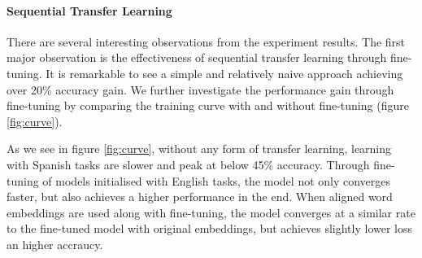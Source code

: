 \documentclass[]{article}
\begin{document}
\paragraph{Sequential Transfer Learning}
There are several interesting observations from the experiment results. The first major observation is the effectiveness of sequential transfer learning through fine-tuning. It is remarkable to see a simple and relatively naive approach achieving over 20\% accuracy gain. We further investigate the performance gain through fine-tuning by comparing the training curve with and without fine-tuning (figure \ref{fig:curve}).

As we see in figure \ref{fig:curve}, without any form of transfer learning, learning with Spanish tasks are slower and peak at below 45\% accuracy. Through fine-tuning of models initialised with English tasks, the model not only converges faster, but also achieves a higher performance in the end. When aligned word embeddings are used along with fine-tuning, the model converges at a similar rate to the fine-tuned model with original embeddings, but achieves slightly lower loss an higher accraucy.
\end{document}
